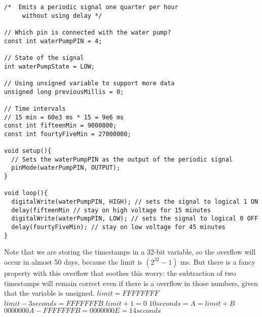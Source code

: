 \begin{lstlisting}[style=Arduino, caption=Water Cycle Code without Delays]
 /*  Emits a periodic signal one quarter per hour
     without using delay */

// Which pin is connected with the water pump?
const int waterPumpPIN = 4;

// State of the signal
int waterPumpState = LOW;

// Using unsigned variable to support more data
unsigned long previousMillis = 0;

// Time intervals
// 15 min = 60e3 ms * 15 = 9e6 ms
const int fifteenMin = 9000000;
const int fourtyFiveMin = 27000000;

void setup(){
  // Sets the waterPumpPIN as the output of the periodic signal
  pinMode(waterPumpPIN, OUTPUT);
}

void loop(){
  digitalWrite(waterPumpPIN, HIGH); // sets the signal to logical 1 ON
  delay(fifteenMin // stay on high voltage for 15 minutes
  digitalWrite(waterPumpPIN, LOW); // sets the signal to logical 0 OFF
  delay(fourtyFiveMin); // stay on low voltage for 45 minutes
}
\end{lstlisting}

Note that we are storing the timestamps in a 32-bit variable,
so the overflow will occur in almost 50 days,
because the limit is $ ( 2^{32} -1 ) $ ms.
But there is a fancy property with this overflow that soothes this worry:
the subtraction of two timestamps will remain correct even if there is a overflow in those numbers,
given that the variable is unsigned.
$ limit = FFFF FFFF $
$ limit - 3 seconds = FFFF FFFB $
$ limit + 1 = 0 $
$ 10 seconds = A = limit + B $
$ 0000 000A - FFFF FFFB = 0000 000E = 14 seconds $
